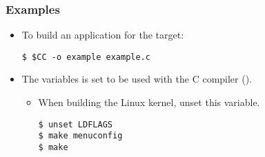 \begin{frame}[fragile]
  \frametitle{Examples}
  \begin{itemize}
    \item To build an application for the target:
      \begin{block}{}
        \begin{verbatim}
$ $CC -o example example.c
        \end{verbatim}
      \end{block}
    \item The  variables is set to be used with the C
      compiler ().
      \begin{itemize}
        \item When building the Linux kernel, unset this variable.
          \begin{block}{}
            \begin{verbatim}
$ unset LDFLAGS
$ make menuconfig
$ make
            \end{verbatim}
          \end{block}
      \end{itemize}
  \end{itemize}
\end{frame}
